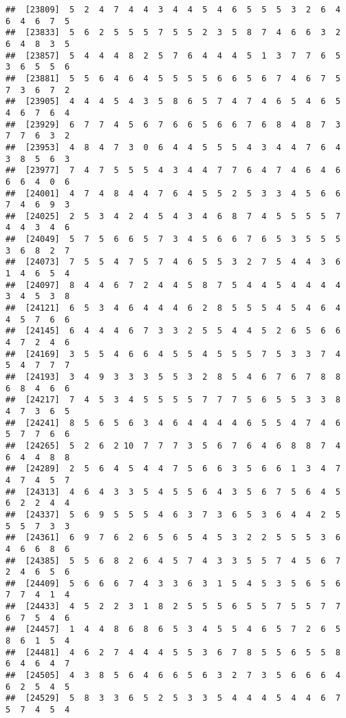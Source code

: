 \documentclass[
]{book}
\begin{document}
\begin{verbatim}
##  [23809]  5  2  4  7  4  4  3  4  4  5  4  6  5  5  5  3  2  6  4  6  4  6  7  5
##  [23833]  5  6  2  5  5  5  7  5  5  2  3  5  8  7  4  6  6  3  2  6  4  8  3  5
##  [23857]  5  4  4  4  8  2  5  7  6  4  4  4  5  1  3  7  7  6  5  3  6  5  5  6
##  [23881]  5  5  6  4  6  4  5  5  5  5  6  6  5  6  7  4  6  7  5  7  3  6  7  2
##  [23905]  4  4  4  5  4  3  5  8  6  5  7  4  7  4  6  5  4  6  5  4  6  7  6  4
##  [23929]  6  7  7  4  5  6  7  6  6  5  6  6  7  6  8  4  8  7  3  7  7  6  3  2
##  [23953]  4  8  4  7  3  0  6  4  4  5  5  5  4  3  4  4  7  6  4  3  8  5  6  3
##  [23977]  7  4  7  5  5  5  4  3  4  4  7  7  6  4  7  4  6  4  6  6  6  4  0  6
##  [24001]  4  7  4  8  4  4  7  6  4  5  5  2  5  3  3  4  5  6  6  7  4  6  9  3
##  [24025]  2  5  3  4  2  4  5  4  3  4  6  8  7  4  5  5  5  5  7  4  4  3  4  6
##  [24049]  5  7  5  6  6  5  7  3  4  5  6  6  7  6  5  3  5  5  5  3  6  8  2  7
##  [24073]  7  5  5  4  7  5  7  4  6  5  5  3  2  7  5  4  4  3  6  1  4  6  5  4
##  [24097]  8  4  4  6  7  2  4  4  5  8  7  5  4  4  5  4  4  4  4  3  4  5  3  8
##  [24121]  6  5  3  4  6  4  4  4  6  2  8  5  5  5  4  5  4  6  4  4  5  7  6  6
##  [24145]  6  4  4  4  6  7  3  3  2  5  5  4  4  5  2  6  5  6  6  4  7  2  4  6
##  [24169]  3  5  5  4  6  6  4  5  5  4  5  5  5  7  5  3  3  7  4  5  4  7  7  7
##  [24193]  3  4  9  3  3  3  5  5  3  2  8  5  4  6  7  6  7  8  8  6  8  4  6  6
##  [24217]  7  4  5  3  4  5  5  5  5  7  7  7  5  6  5  5  3  3  8  4  7  3  6  5
##  [24241]  8  5  6  5  6  3  4  6  4  4  4  4  6  5  5  4  7  4  6  5  7  7  6  6
##  [24265]  5  2  6  2 10  7  7  7  3  5  6  7  6  4  6  8  8  7  4  6  4  4  8  8
##  [24289]  2  5  6  4  5  4  4  7  5  6  6  3  5  6  6  1  3  4  7  4  7  4  5  7
##  [24313]  4  6  4  3  3  5  4  5  5  6  4  3  5  6  7  5  6  4  5  6  2  2  4  4
##  [24337]  5  6  9  5  5  5  4  6  3  7  3  6  5  3  6  4  4  2  5  5  5  7  3  3
##  [24361]  6  9  7  6  2  6  5  6  5  4  5  3  2  2  5  5  5  3  6  4  6  6  8  6
##  [24385]  5  5  6  8  2  6  4  5  7  4  3  3  5  5  7  4  5  6  7  2  4  6  5  6
##  [24409]  5  6  6  6  7  4  3  3  6  3  1  5  4  5  3  5  6  5  6  7  7  4  1  4
##  [24433]  4  5  2  2  3  1  8  2  5  5  5  6  5  5  7  5  5  7  7  6  7  5  4  6
##  [24457]  1  4  4  8  6  8  6  5  3  4  5  5  4  6  5  7  2  6  5  8  6  1  5  4
##  [24481]  4  6  2  7  4  4  4  5  5  3  6  7  8  5  5  6  5  5  8  6  4  6  4  7
##  [24505]  4  3  8  5  6  4  6  6  5  6  3  2  7  3  5  6  6  6  4  6  2  5  4  5
##  [24529]  5  8  3  3  6  5  2  5  3  3  5  4  4  4  5  4  4  6  7  5  7  4  5  4

\end{verbatim}
\end{document}
